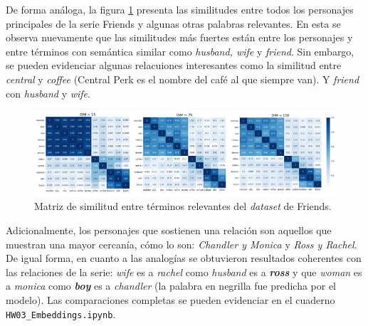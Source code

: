 De forma análoga, la figura \ref{fig:friends_sim_matrix} presenta las similitudes entre todos los personajes principales de la serie Friends y algunas otras palabras relevantes. En esta se observa nuevamente que las similitudes más fuertes están entre los personajes y entre términos con semántica similar como \textit{husband, wife} y \textit{friend}. Sin embargo, se pueden evidenciar algunas relacuiones interesantes como la similitud  entre \textit{central} y \textit{coffee} (Central Perk es el nombre del café al que siempre van). Y \textit{friend} con \textit{husband} y \textit{wife}. \\

\begin{figure}[H]
    \centering
    \includegraphics[width=\textwidth]{doc/images/friends_sim_matrix.png}
    \caption{Matriz de similitud entre términos relevantes del \textit{dataset} de Friends.}
    \label{fig:friends_sim_matrix}
\end{figure}

Adicionalmente, los personajes que sostienen una relación son aquellos que muestran una mayor cercanía, cómo lo son: \textit{Chandler y Monica} y \textit{Ross y Rachel}. De igual forma, en cuanto a las analogías se obtuvieron resultados coherentes con las relaciones de la serie: \textit{wife} es a \textit{rachel} como \textit{husband} es a \textit{\textbf{ross}} y que \textit{woman} es a \textit{monica} como \textit{\textbf{boy}} es a \textit{chandler} (la palabra en negrilla fue predicha por el modelo). Las comparaciones completas se pueden evidenciar en el cuaderno \texttt{HW03\_Embeddings.ipynb}.

\newpage